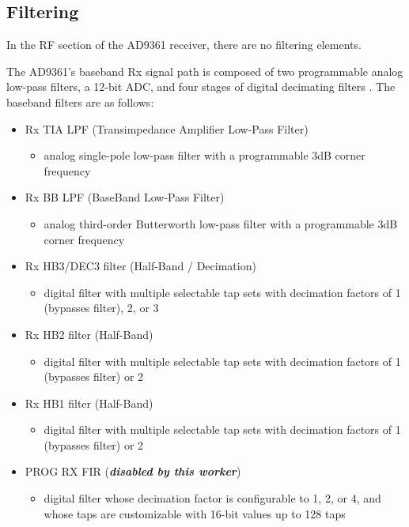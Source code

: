 \subsection*{Filtering}
In the RF section of the AD9361 receiver, there are no filtering elements.\par\medskip
\noindent The AD9361's baseband Rx
signal path is composed of two programmable analog low-pass
filters, a 12-bit ADC, and four stages of digital decimating
filters \cite{adi_ug570}.
\noindent The baseband filters are as follows:
\begin{itemize}
\item Rx TIA LPF (Transimpedance Amplifier Low-Pass Filter)
\begin{itemize}
\item analog single-pole low-pass filter with a programmable 3dB corner frequency
\end{itemize}
\item Rx BB LPF (BaseBand Low-Pass Filter)
\begin{itemize}
\item analog third-order Butterworth low-pass filter with a programmable 3dB corner frequency
\end{itemize}
\item Rx HB3/DEC3 filter (Half-Band / Decimation)
\begin{itemize}
\item digital filter with multiple selectable tap sets with decimation factors of 1 (bypasses filter), 2, or 3
\end{itemize}
\item Rx HB2 filter (Half-Band)
\begin{itemize}
\item digital filter with multiple selectable tap sets with decimation factors of 1 (bypasses filter) or 2
\end{itemize}
\item Rx HB1 filter (Half-Band)
\begin{itemize}
\item digital filter with multiple selectable tap sets with decimation factors of 1 (bypasses filter) or 2
\end{itemize}
\item PROG RX FIR (\textit{\textbf{disabled by this worker}})
\begin{itemize}
\item digital filter whose decimation factor is configurable to 1, 2, or 4, and whose taps are customizable with 16-bit values up to 128 taps
\end{itemize}
\end{itemize}
